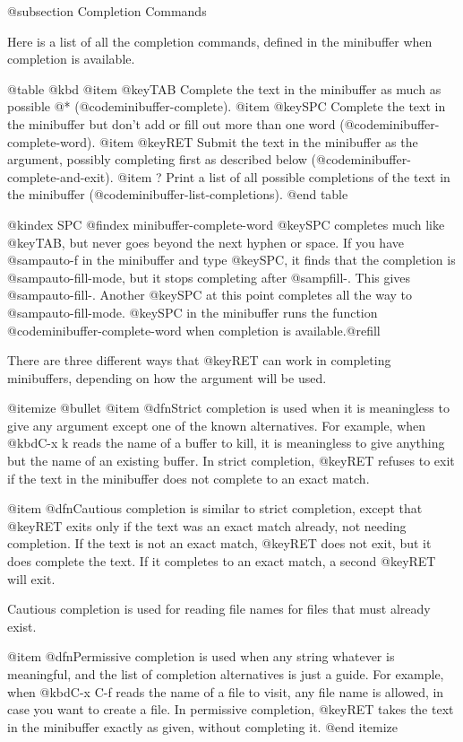 {{{{{{@subsection Completion Commands

  Here is a list of all the completion commands, defined in the minibuffer
when completion is available.

@table @kbd
@item @key{TAB}
Complete the text in the minibuffer as much as possible @*
(@code{minibuffer-complete}).
@item @key{SPC}
Complete the text in the minibuffer but don't add or fill out more
than one word (@code{minibuffer-complete-word}).
@item @key{RET}
Submit the text in the minibuffer as the argument, possibly completing
first as described below (@code{minibuffer-complete-and-exit}).
@item ?
Print a list of all possible completions of the text in the minibuffer
(@code{minibuffer-list-completions}).
@end table

@kindex SPC
@findex minibuffer-complete-word
  @key{SPC} completes much like @key{TAB}, but never goes beyond the
next hyphen or space.  If you have @samp{auto-f} in the minibuffer and type
@key{SPC}, it finds that the completion is @samp{auto-fill-mode}, but it
stops completing after @samp{fill-}.  This gives @samp{auto-fill-}.
Another @key{SPC} at this point completes all the way to
@samp{auto-fill-mode}.  @key{SPC} in the minibuffer runs the function
@code{minibuffer-complete-word} when completion is available.@refill

  There are three different ways that @key{RET} can work in completing
minibuffers, depending on how the argument will be used.

@itemize @bullet
@item
@dfn{Strict} completion is used when it is meaningless to give any
argument except one of the known alternatives.  For example, when
@kbd{C-x k} reads the name of a buffer to kill, it is meaningless to
give anything but the name of an existing buffer.  In strict
completion, @key{RET} refuses to exit if the text in the minibuffer
does not complete to an exact match.

@item
@dfn{Cautious} completion is similar to strict completion, except that
@key{RET} exits only if the text was an exact match already, not
needing completion.  If the text is not an exact match, @key{RET} does
not exit, but it does complete the text.  If it completes to an exact
match, a second @key{RET} will exit.

Cautious completion is used for reading file names for files that must
already exist.

@item
@dfn{Permissive} completion is used when any string whatever is
meaningful, and the list of completion alternatives is just a guide.
For example, when @kbd{C-x C-f} reads the name of a file to visit, any
file name is allowed, in case you want to create a file.  In
permissive completion, @key{RET} takes the text in the minibuffer
exactly as given, without completing it.
@end itemize

}}}}}}
